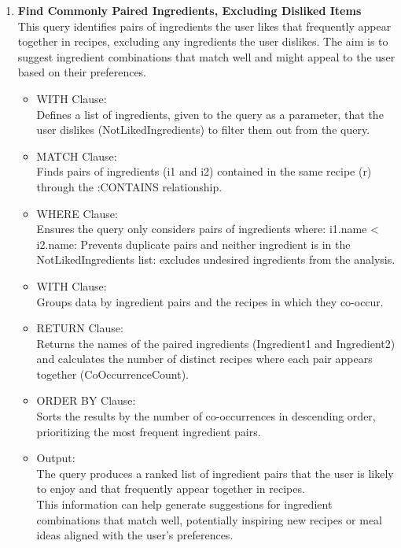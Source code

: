 \begin{enumerate}
    \clearpage
    \item {}
          \textbf{Find Commonly Paired Ingredients, Excluding Disliked Items}\\
    This query identifies pairs of ingredients the user likes that frequently appear together in recipes, excluding any ingredients the user dislikes. The aim is to suggest ingredient combinations that match well and might appeal to the user based on their preferences.
    \begin{itemize}
        \item WITH Clause:\\
Defines a list of ingredients, given to the query as a parameter, that the user dislikes (NotLikedIngredients) to filter them out from the query.
        \item MATCH Clause:\\
Finds pairs of ingredients (i1 and i2) contained in the same recipe (r) through the :CONTAINS relationship.
        \item WHERE Clause:\\
Ensures the query only considers pairs of ingredients where:
i1.name < i2.name: Prevents duplicate pairs and neither ingredient is in the NotLikedIngredients list: excludes undesired ingredients from the analysis.
        \item WITH Clause:\\
Groups data by ingredient pairs and the recipes in which they co-occur.
        \item RETURN Clause:\\
Returns the names of the paired ingredients (Ingredient1 and Ingredient2) and calculates the number of distinct recipes where each pair appears together (CoOccurrenceCount).
        \item ORDER BY Clause:\\
Sorts the results by the number of co-occurrences in descending order, prioritizing the most frequent ingredient pairs.
        \item Output:\\
The query produces a ranked list of ingredient pairs that the user is likely to enjoy and that frequently appear together in recipes. \\This information can help generate suggestions for ingredient combinations that match well, potentially inspiring new recipes or meal ideas aligned with the user's preferences.
    \end{itemize}

\end{enumerate}
